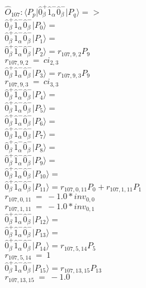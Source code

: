 \documentclass[14pt]{article}
\begin{document}
    $\hat{O}_{107}:  \langle{P_p}\vert \hat{0}_{\beta}^{+}\hat{1}_{\alpha}^{-}\hat{0}_{\beta}^{-} \vert{P_q}\rangle => $ \\ 
    $ \hat{0}_{\beta}^{+}\hat{1}_{\alpha}^{-}\hat{0}_{\beta}^{-} \vert{P_{0}}\rangle =  $ \\ 
    $ \hat{0}_{\beta}^{+}\hat{1}_{\alpha}^{-}\hat{0}_{\beta}^{-} \vert{P_{1}}\rangle =  $ \\ 
    $ \hat{0}_{\beta}^{+}\hat{1}_{\alpha}^{-}\hat{0}_{\beta}^{-} \vert{P_{2}}\rangle = {r}_{107,9,2}P_{9} $ \\ 
    ${r}_{107,9,2}\ =\ {ci}_{2,3} $ \\ 
    $ \hat{0}_{\beta}^{+}\hat{1}_{\alpha}^{-}\hat{0}_{\beta}^{-} \vert{P_{3}}\rangle = {r}_{107,9,3}P_{9} $ \\ 
    ${r}_{107,9,3}\ =\ {ci}_{3,3} $ \\ 
    $ \hat{0}_{\beta}^{+}\hat{1}_{\alpha}^{-}\hat{0}_{\beta}^{-} \vert{P_{4}}\rangle =  $ \\ 
    $ \hat{0}_{\beta}^{+}\hat{1}_{\alpha}^{-}\hat{0}_{\beta}^{-} \vert{P_{5}}\rangle =  $ \\ 
    $ \hat{0}_{\beta}^{+}\hat{1}_{\alpha}^{-}\hat{0}_{\beta}^{-} \vert{P_{6}}\rangle =  $ \\ 
    $ \hat{0}_{\beta}^{+}\hat{1}_{\alpha}^{-}\hat{0}_{\beta}^{-} \vert{P_{7}}\rangle =  $ \\ 
    $ \hat{0}_{\beta}^{+}\hat{1}_{\alpha}^{-}\hat{0}_{\beta}^{-} \vert{P_{8}}\rangle =  $ \\ 
    $ \hat{0}_{\beta}^{+}\hat{1}_{\alpha}^{-}\hat{0}_{\beta}^{-} \vert{P_{9}}\rangle =  $ \\ 
    $ \hat{0}_{\beta}^{+}\hat{1}_{\alpha}^{-}\hat{0}_{\beta}^{-} \vert{P_{10}}\rangle =  $ \\ 
    $ \hat{0}_{\beta}^{+}\hat{1}_{\alpha}^{-}\hat{0}_{\beta}^{-} \vert{P_{11}}\rangle = {r}_{107,0,11}P_{0}+{r}_{107,1,11}P_{1} $ \\ 
    ${r}_{107,0,11}\ =\ -1.0*{inv}_{0,0} $ \\ 
    ${r}_{107,1,11}\ =\ -1.0*{inv}_{0,1} $ \\ 
    $ \hat{0}_{\beta}^{+}\hat{1}_{\alpha}^{-}\hat{0}_{\beta}^{-} \vert{P_{12}}\rangle =  $ \\ 
    $ \hat{0}_{\beta}^{+}\hat{1}_{\alpha}^{-}\hat{0}_{\beta}^{-} \vert{P_{13}}\rangle =  $ \\ 
    $ \hat{0}_{\beta}^{+}\hat{1}_{\alpha}^{-}\hat{0}_{\beta}^{-} \vert{P_{14}}\rangle = {r}_{107,5,14}P_{5} $ \\ 
    ${r}_{107,5,14}\ =\ 1 $ \\ 
    $ \hat{0}_{\beta}^{+}\hat{1}_{\alpha}^{-}\hat{0}_{\beta}^{-} \vert{P_{15}}\rangle = {r}_{107,13,15}P_{13} $ \\ 
    ${r}_{107,13,15}\ =\ -1.0 $ \\ 
    
\end{document}
